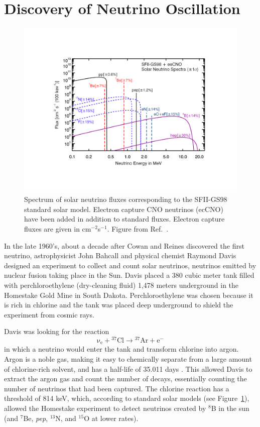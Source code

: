 \section{Discovery of Neutrino Oscillation} \label{sec:NeutrinoOsc}

\begin{figure}[h]
	\centering
	\includegraphics[width=0.7\linewidth]{tex/2-neutrinos-images/SolarFlux}
	\caption[Spectrum of solar neutrino fluxes]{Spectrum of solar neutrino fluxes corresponding to the SFII-GS98 standard solar model. Electron capture CNO neutrinos (ecCNO) have been added in addition to standard fluxes. Electron capture fluxes are given in cm$^{-2}$s$^{-1}$. Figure from Ref.~\cite{Serenelli:2016dgz}.}
	\label{fig:solarflux}
\end{figure}

In the late 1960's, about a decade after Cowan and Reines discovered the first neutrino, astrophysicist John Bahcall and physical chemist Raymond Davis designed an experiment to collect and count solar neutrinos, neutrinos emitted by nuclear fusion taking place in the Sun. 
Davis placed a 380 cubic meter tank filled with perchloroethylene (dry-cleaning fluid) 1,478 meters underground in the Homestake Gold Mine in South Dakota. 
Perchloroethylene was chosen because it is rich in chlorine and the tank was placed deep underground to shield the experiment from cosmic rays. 

Davis was looking for the reaction 
\begin{equation}
	\mathrm{\nu _{e}+ {^{37}Cl} \rightarrow  {^{37}Ar+e^{-}}} 
	\label{eq:ClAr}
\end{equation}
in which a neutrino would enter the tank and transform chlorine into argon. 
Argon is a noble gas, making it easy to chemically separate from a large amount of chlorine-rich solvent, and has a half-life of 35.011 days \cite{NuclideChart}.
This allowed Davis to extract the argon gas and count the number of decays, essentially counting the number of neutrinos that had been captured.
The chlorine reaction has a threshold of 814 keV, which, according to standard solar models (see Figure~\ref{fig:solarflux}), allowed the Homestake experiment to detect neutrinos created by $^8$B in the sun (and $^7$Be, \textit{pep}, $^{13}$N, and $^{15}$O at lower rates).

